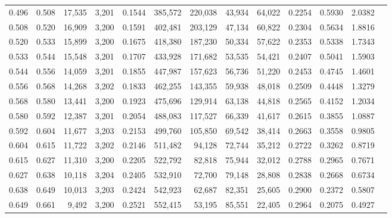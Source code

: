 \begin{tabular}{rrrrrrrrrrrrr}
0.496 & 0.508 & 17,535 & 3,201 &                                     0.1544 & 385,572 & 220,038 &  43,934 &  64,022 & 0.2254 & 0.5930 & 2.0382 \\
0.508 & 0.520 & 16,909 & 3,200 &                                     0.1591 & 402,481 & 203,129 &  47,134 &  60,822 & 0.2304 & 0.5634 & 1.8816 \\
0.520 & 0.533 & 15,899 & 3,200 &                                     0.1675 & 418,380 & 187,230 &  50,334 &  57,622 & 0.2353 & 0.5338 & 1.7343 \\
0.533 & 0.544 & 15,548 & 3,201 &                                     0.1707 & 433,928 & 171,682 &  53,535 &  54,421 & 0.2407 & 0.5041 & 1.5903 \\
0.544 & 0.556 & 14,059 & 3,201 &                                     0.1855 & 447,987 & 157,623 &  56,736 &  51,220 & 0.2453 & 0.4745 & 1.4601 \\
0.556 & 0.568 & 14,268 & 3,202 &                                     0.1833 & 462,255 & 143,355 &  59,938 &  48,018 & 0.2509 & 0.4448 & 1.3279 \\
0.568 & 0.580 & 13,441 & 3,200 &                                     0.1923 & 475,696 & 129,914 &  63,138 &  44,818 & 0.2565 & 0.4152 & 1.2034 \\
0.580 & 0.592 & 12,387 & 3,201 &                                     0.2054 & 488,083 & 117,527 &  66,339 &  41,617 & 0.2615 & 0.3855 & 1.0887 \\
0.592 & 0.604 & 11,677 & 3,203 &                                     0.2153 & 499,760 & 105,850 &  69,542 &  38,414 & 0.2663 & 0.3558 & 0.9805 \\
0.604 & 0.615 & 11,722 & 3,202 &                                     0.2146 & 511,482 &  94,128 &  72,744 &  35,212 & 0.2722 & 0.3262 & 0.8719 \\
0.615 & 0.627 & 11,310 & 3,200 &                                     0.2205 & 522,792 &  82,818 &  75,944 &  32,012 & 0.2788 & 0.2965 & 0.7671 \\
0.627 & 0.638 & 10,118 & 3,204 &                                     0.2405 & 532,910 &  72,700 &  79,148 &  28,808 & 0.2838 & 0.2668 & 0.6734 \\
0.638 & 0.649 & 10,013 & 3,203 &                                     0.2424 & 542,923 &  62,687 &  82,351 &  25,605 & 0.2900 & 0.2372 & 0.5807 \\
0.649 & 0.661 &  9,492 & 3,200 &                                     0.2521 & 552,415 &  53,195 &  85,551 &  22,405 & 0.2964 & 0.2075 & 0.4927 \\

\end{tabular}
